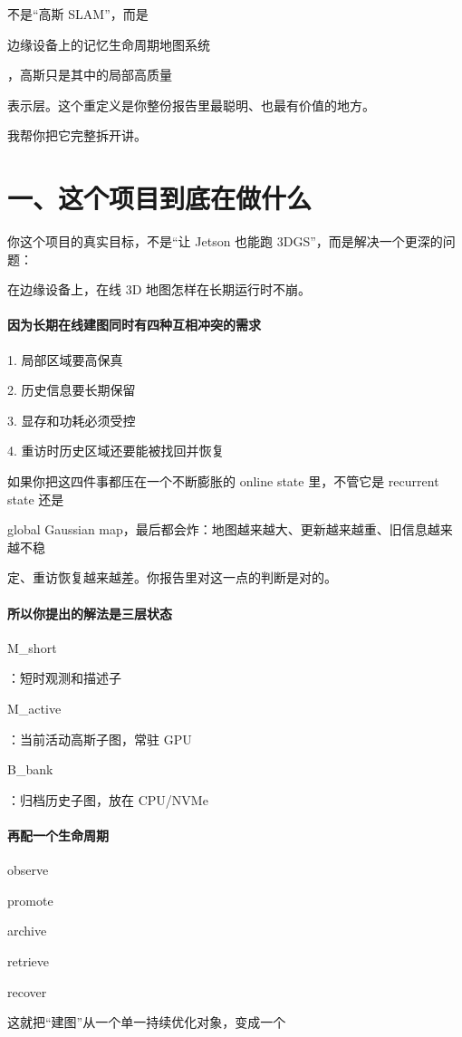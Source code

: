 \documentclass[12pt]{article}
\begin{document}
不是“高斯 SLAM”，而是

边缘设备上的记忆生命周期地图系统

，高斯只是其中的局部高质量

表示层。这个重定义是你整份报告里最聪明、也最有价值的地方。

我帮你把它完整拆开讲。

\section{一、这个项目到底在做什么}
你这个项目的真实目标，不是“让 Jetson 也能跑 3DGS”，而是解决一个更深的问题：

在边缘设备上，在线 3D 地图怎样在长期运行时不崩。

\paragraph{因为长期在线建图同时有四种互相冲突的需求}
1. 局部区域要高保真

2. 历史信息要长期保留

3. 显存和功耗必须受控

4. 重访时历史区域还要能被找回并恢复

如果你把这四件事都压在一个不断膨胀的 online state 里，不管它是 recurrent state 还是

global Gaussian map，最后都会炸：地图越来越大、更新越来越重、旧信息越来越不稳

定、重访恢复越来越差。你报告里对这一点的判断是对的。

\paragraph{所以你提出的解法是三层状态}
M\_short

：短时观测和描述子

M\_active

：当前活动高斯子图，常驻 GPU

B\_bank

：归档历史子图，放在 CPU/NVMe

\paragraph{再配一个生命周期}
observe

promote

archive

retrieve

recover

这就把“建图”从一个单一持续优化对象，变成一个
\end{document}
